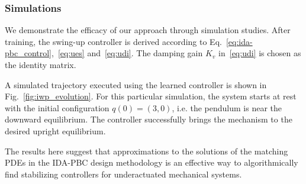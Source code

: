 
\subsubsection{Simulations}

We demonstrate the efficacy of our approach through simulation studies. After
training, the swing-up controller is derived according to
Eq.~\eqref{eq:ida-pbc_control},~\eqref{eq:ues} and~\eqref{eq:udi}. The damping
gain $K_v$ in~\eqref{eq:udi} is chosen as the identity matrix.

A simulated trajectory executed using the learned controller is shown in
Fig.~\ref{fig:iwp_evolution}. For this particular simulation, the system starts
at rest with the initial configuration $q(0) = (3,0)$, i.e. the pendulum is near
the downward equilibrium. The controller successfully brings the mechanism to
the desired upright equilibrium.

The results here suggest that approximations to the solutions of the matching
PDEs in the IDA-PBC design methodology is an effective way to algorithmically
find stabilizing controllers for underactuated mechanical systems.

